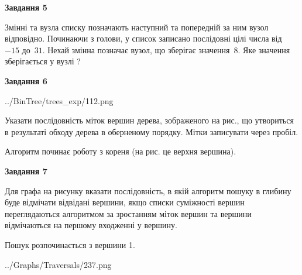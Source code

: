 \documentclass[12pt, ukrainian]{article}
\begin{document}
{\begin {large}
{\begin {center}\textbf{Завдання 5}\end {center}}\par
Змінні  та  вузла списку позначають наступний та попередній за ним вузол відповідно. Починаючи з голови, у список записано послідовні цілі числа від~$-15$ до~$31$. Нехай змінна  позначає вузол, що зберігає значення~$8$.
Яке значення зберігається у вузлі  ?\par
\newpage

{\begin {center}\textbf{Завдання 6}\end {center}}\par

\begin{center}
	{../BinTree/trees_exp/112.png}
\end{center}
Указати послідовність міток вершин дерева, зображеного на рис., що утвориться в результаті обходу дерева в оберненому порядку. Мітки записувати через пробіл.\par Алгоритм починає роботу з кореня (на рис. це верхня вершина).\par
\newpage

{\begin {center}\textbf{Завдання 7}\end {center}}\par
Для графа на рисунку вказати послідовність, в якій алгоритм пошуку в глибину буде відмічати відвідані вершини, якщо списки суміжності вершин переглядаються алгоритмом за зростанням міток вершин та вершини відмічаються на першому вход\-женні у вершину.\par
Пошук розпочинається з вершини 1.\par

\begin{center}
	{../Graphs/Traversals/237.png}
\end{center}\par
\newpage


\end{large}}
\end{document}
